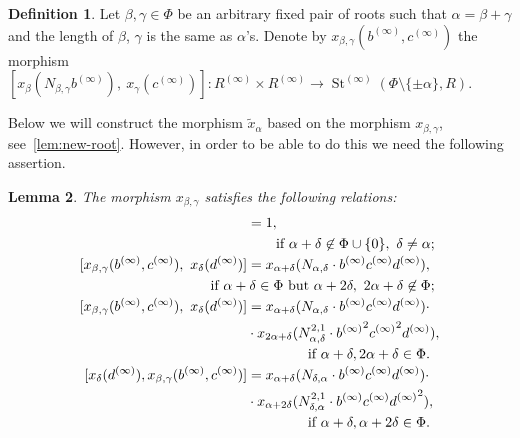 \documentclass{article}
\numberwithin{equation}{section}
\newtheorem{lemma}{Lemma} \numberwithin{lemma}{section}
\theoremstyle{definition}
\newtheorem{df}[lemma]{Definition} \Crefname{df}{Definition}{Definitions}
\theoremstyle{remark}
\DeclareMathOperator\St{St}
\begin{document}
\begin{df} \label{def:xbg}
Let $\beta, \gamma \in \Phi$ be an arbitrary fixed pair of roots such that $\alpha = \beta+\gamma$ and the length of $\beta$, $\gamma$ is the same as $\alpha$'s. 
Denote by $x_{\beta,\gamma}(b^{(\infty)}, c^{(\infty)})$ the morphism
 $[x_\beta(N_{\beta,\gamma}b^{(\infty)}),\ x_\gamma(c^{(\infty)})]\colon R^{(\infty)} \times R^{(\infty)} \to \St^{(\infty)}(\Phi \setminus\{\pm\alpha\}, R).$
\end{df}
Below we will construct the morphism $\widetilde x_\alpha$ based on the morphism $x_{\beta,\gamma}$, see~\cref{lem:new-root}. However, in order to be able to do this we need the following assertion.

\begin{lemma} \label{lem:elim-lhs}
 The morphism $x_{\beta, \gamma}$ satisfies the following relations:
 \begin{align}  
  [x_{\beta, \gamma}(b^{(\infty)}, c^{(\infty)}),\ x_\delta(d^{(\infty)})] &= 1, \label{R2-bg}\\ 
 \multispan2{\hfil if $\alpha + \delta \not\in\Phi \cup \{0\},\ \delta\neq\alpha;$} \nonumber \\
 [x_{\beta, \gamma}(b^{(\infty)}, c^{(\infty)}),\ x_\delta(d^{(\infty)})] &= x_{\alpha + \delta}(N_{\alpha,\delta} \cdot b^{(\infty)}c^{(\infty)}d^{(\infty)}), \label{R3-bg} \\
 \multispan2{\hfill if $\alpha+\delta\in\Phi$ but $\alpha+2\delta,\ 2\alpha+\delta\not\in\Phi;$} \nonumber \\
 [x_{\beta, \gamma}(b^{(\infty)}, c^{(\infty)}),\ x_\delta(d^{(\infty)})] &= x_{\alpha + \delta}(N_{\alpha,\delta} \cdot b^{(\infty)}c^{(\infty)}d^{(\infty)}) \cdot \label{R4-bg1} \\ & \cdot x_{2\alpha+\delta}(N_{\alpha,\delta}^{2,1} \cdot {b^{(\infty)}}^2{c^{(\infty)}}^2d^{(\infty)}), \nonumber \\ \multispan2{ \hfill if $\alpha+\delta,2\alpha+\delta\in\Phi.$ \nonumber} \\
 [x_\delta(d^{(\infty)}), x_{\beta, \gamma}(b^{(\infty)}, c^{(\infty)})] &= x_{\alpha + \delta}(N_{\delta, \alpha} \cdot b^{(\infty)}c^{(\infty)}d^{(\infty)}) \cdot \label{R4-bg2} \\ & \cdot x_{\alpha+2\delta}(N_{\delta, \alpha}^{2,1} \cdot {b^{(\infty)}}{c^{(\infty)}}{d^{(\infty)}}^2), \nonumber \\ \multispan2{ \hfill if $\alpha+\delta,\alpha+2\delta\in\Phi.$ \nonumber} \end{align}
\end{lemma}
\end{document}
